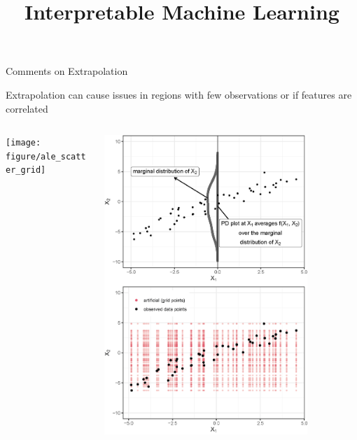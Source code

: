 \documentclass[11pt,compress,t,notes=noshow, aspectratio=169, xcolor=table]{beamer}
\title{Interpretable Machine Learning}
\date{}
\begin{document}
\newcommand{\titlefigure}{figure/pdp_bike}
\newcommand{\learninggoals}{
\item Extrapolation and Interactions in PDPs
\item Centered ICE and PDP
}


\begin{frame}{Comments on Extrapolation}


Extrapolation can cause issues in regions with few observations or if features are correlated
 
\begin{columns}[T, totalwidth=\textwidth]
\begin{column}{0.5\textwidth}
\centering
\texttt{[image: figure/ale\_scatter\_grid]}
\end{column}
\begin{column}{0.5\textwidth}
\centering
\includegraphics[width=0.8\textwidth]{figure/ale_pdplot}
\end{column}
\end{columns}


\end{frame}
\end{document}
